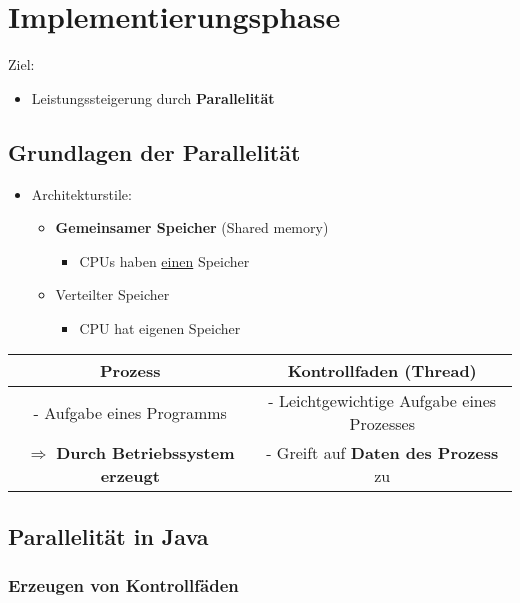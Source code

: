\section{Implementierungsphase}
	
	Ziel:				
	\begin{itemize}
		\item Leistungssteigerung durch \textbf{Parallelität}
	\end{itemize}
	
	\subsection{Grundlagen der Parallelität}
		
		\begin{itemize}
			\item Architekturstile:
			\begin{itemize}
				\item \textbf{Gemeinsamer Speicher} (Shared memory)
				\begin{itemize}
					\item CPUs haben \underline{einen} Speicher
				\end{itemize}
				\item Verteilter Speicher
				\begin{itemize}
					\item CPU hat eigenen Speicher
				\end{itemize}
			\end{itemize}
		\end{itemize}
				
		\begin{center}
			\begin{tabular}{c|c}
				Prozess                                             & Kontrollfaden (Thread) \\
				\hline
				- Aufgabe eines Programms                           & - Leichtgewichtige Aufgabe eines Prozesses \\
				$\Rightarrow$ \textbf{Durch Betriebssystem erzeugt} & - Greift auf \textbf{Daten des Prozess} zu \\
			\end{tabular}
		\end{center}
		
	\subsection{Parallelität in Java}
			
		\subsubsection{Erzeugen von Kontrollfäden}
					
